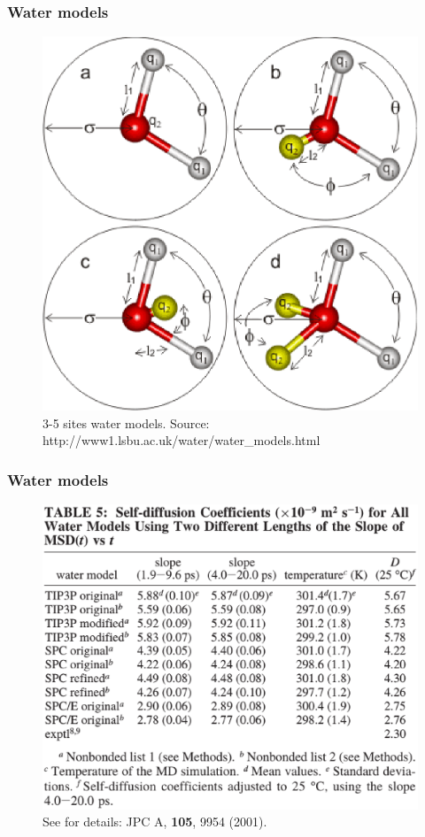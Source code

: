 \documentclass{beamer}
\begin{document}
\begin{frame}\frametitle{Water models}

\begin{figure}
\includegraphics[scale=0.34]{h2o_models.eps}
\caption{{\scriptsize 3-5 sites water models. Source: http://www1.lsbu.ac.uk/water/water\_models.html}}
\end{figure}

\end{frame}


\begin{frame}\frametitle{Water models}

\begin{figure}
\includegraphics[scale=0.3]{nilsson_water.eps}
\caption{{\scriptsize See for details: JPC A, {\bf 105}, 9954 (2001). }}
\end{figure}

\end{frame}
\end{document}
